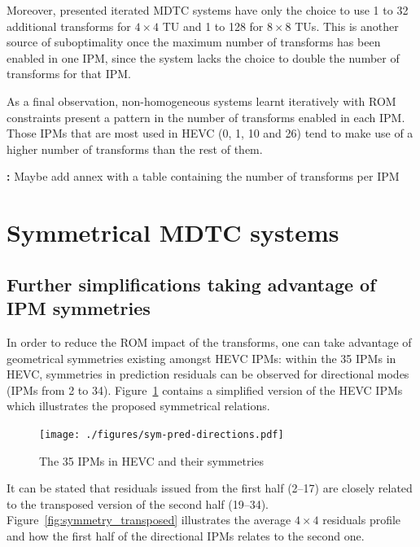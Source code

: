 \documentclass[11pt,a4paper,openright,twoside]{book}
\providecommand{\todo}[1]{
	\begin{center}
		\colorbox{yellowish}{
			\begin{minipage}{0.95\linewidth}
				\textbf{\color{redish}{TODO}:} #1
			\end{minipage}
		}
	\end{center}
}
\numberwithin{equation}{section} %
\numberwithin{figure}{section} %
\numberwithin{table}{section} %
\begin{document}
Moreover, presented iterated \ac{MDTC} systems have only the choice to use 1
to 32 additional transforms for $4\times4$ \acs{TU} and 1 to 128 for
$8\times8$ \acp{TU}.
This is another source of suboptimality once the maximum number of transforms
has been enabled in one \ac{IPM}, since the system lacks the choice to double
the number of transforms for that \ac{IPM}.

As a final observation, non-homogeneous systems learnt iteratively with
\acs{ROM} constraints present a pattern in the number of transforms enabled in
each \ac{IPM}.
Those \acp{IPM} that are most used in \ac{HEVC} (0, 1, 10 and 26) tend to make
use of a higher number of transforms than the rest of them.

\todo{Maybe add annex with a table containing the number of transforms per
\ac{IPM}}

\section{Symmetrical \acs{MDTC} systems}
\label{sec:sym_mdtc}

\subsection{Further simplifications taking advantage of \acs{IPM} symmetries}
\label{sub:further_simplifications_taking_advantage_of_ipm_symmetries}

In order to reduce the \acs{ROM} impact of the transforms, one can take
advantage of geometrical symmetries existing amongst \ac{HEVC} \acp{IPM}:
within the 35 \acp{IPM} in \ac{HEVC}, symmetries in prediction residuals can
be observed for directional modes (\acp{IPM} from 2 to 34).
Figure~\ref{fig:sym_pred_directions} contains a simplified version of the
\ac{HEVC} \acp{IPM} which illustrates the proposed symmetrical relations.

\begin{figure}[t]
	\centering
	\texttt{[image: ./figures/sym-pred-directions.pdf]}
	\caption{The 35 \acsp{IPM} in \acs{HEVC} and their symmetries}
	\label{fig:sym_pred_directions}
\end{figure}

It can be stated that residuals issued from the first half (2--17) are closely
related to the transposed version of the second half (19--34).
Figure~\ref{fig:symmetry_transposed} illustrates the average $4\times4$
residuals profile and how the first half of the directional \acp{IPM} relates
to the second one.
\end{document}
